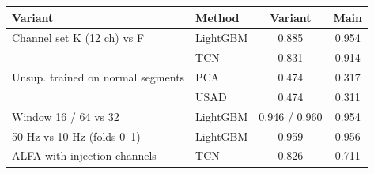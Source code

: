 \begin{tabular}{llcc}
\toprule
Variant & Method & Variant & Main \\
\midrule
Channel set K (12 ch) vs F & LightGBM & 0.885 & 0.954 \\
 & TCN & 0.831 & 0.914 \\
Unsup. trained on normal segments & PCA & 0.474 & 0.317 \\
 & USAD & 0.474 & 0.311 \\
Window 16 / 64 vs 32 & LightGBM & 0.946 / 0.960 & 0.954 \\
50 Hz vs 10 Hz (folds 0--1) & LightGBM & 0.959 & 0.956 \\
ALFA with injection channels & TCN & 0.826 & 0.711 \\
\bottomrule
\end{tabular}
